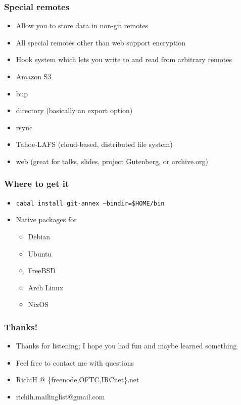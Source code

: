 \documentclass[t]{beamer}
\begin{document}
\begin{frame}
	\frametitle{Special remotes}
	\begin{itemize}
		\item Allow you to store data in non-git remotes
		\item All special remotes other than web support encryption
		\item Hook system which lets you write to and read from arbitrary remotes
		\item Amazon S3
		\item bup
		\item directory (basically an export option)
		\item rsync
		\item Tahoe-LAFS (cloud-based, distributed file system)
		\item web (great for talks, slides, project Gutenberg, or archive.org)
	\end{itemize}
\end{frame}

\begin{frame}
	\frametitle{Where to get it}
	\begin{itemize}
		\item \texttt{cabal install git-annex --bindir=\$HOME/bin}
		\item Native packages for
		\begin{itemize}
			\item Debian
			\item Ubuntu
			\item FreeBSD
			\item Arch Linux
			\item NixOS
		\end{itemize}
	\end{itemize}
\end{frame}

\begin{frame}
	\frametitle{Thanks!}
	\begin{itemize}
		\item Thanks for listening; I hope you had fun and maybe learned something
		\item Feel free to contact me with questions
		\item RichiH @ \{freenode,OFTC,IRCnet\}.net
		\item richih.mailinglist@gmail.com
	\end{itemize}
\end{frame}
\end{document}
